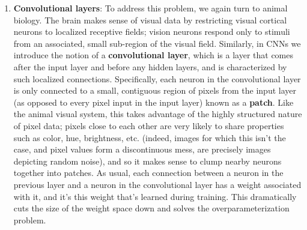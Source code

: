 \documentclass{article}
\begin{document}
\begin{enumerate}
    \item \textbf{Convolutional layers}: To address this problem, we again turn to animal biology. The brain makes sense of visual data by restricting visual cortical neurons to localized receptive fields; vision neurons respond only to stimuli from an associated, small sub-region of the visual field. Similarly, in CNNs we introduce the notion of a \textbf{convolutional layer}, which is a layer that comes after the input layer and before any hidden layers, and is characterized by such localized connections. Specifically, each neuron in the convolutional layer is only connected to a small, contiguous region of pixels from the input layer (as opposed to every pixel input in the input layer) known as a \textbf{patch}. Like the animal visual system, this takes advantage of the highly structured nature of pixel data; pixels close to each other are very likely to share properties such as color, hue, brightness, etc. (indeed, images for which this isn't the case, and pixel values form a discontinuous mess, are precisely images depicting random noise), and so it makes sense to clump nearby neurons together into patches. As usual, each connection between a neuron in the previous layer and a neuron in the convolutional layer has a weight associated with it, and it's this weight that's learned during training. This dramatically cuts the size of the weight space down and solves the overparameterization problem.
    \begin{enumerate}

\end{enumerate}
\end{enumerate}
\end{document}

